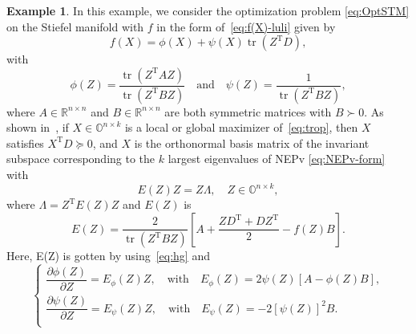 \documentclass[11pt]{article}
\def\bbO{\mathbb{O}}
\def\bbR{\mathbb{R}}
\DeclareMathOperator{\tr}{tr}
\DeclareMathOperator{\T}{T}
\theoremstyle{definition}
\newtheorem{example}{Example}[section]
\numberwithin{equation}{section}
\numberwithin{figure}{section}
\numberwithin{table}{section}
\begin{document}
\iffalse
\begin{example}\label{eg2}
In this example, we consider the optimization problem \eqref{eq:OptSTM} on the Stiefel manifold
with $f$ in the form of~\eqref{eq:f(X)-luli} given by
\begin{equation} \label{eq:trop}
f(X)=\phi(X)+\psi(X)\tr(Z^{\T}D),
\end{equation}
with
\[
\phi(Z)=\frac{\tr(Z^{\T}AZ)}{\tr(Z^{\T}BZ)}\quad\mbox{and}\quad\psi(Z)=\frac{1}{\tr(Z^{\T}BZ)},
\]
where $A\in\bbR^{n\times n}$ and $B\in\bbR^{n\times n}$ are both symmetric matrices with $B\succ 0$.
As shown in~\cite[Theorem~2.3]{wazl:2022}, if $X\in\bbO^{n\times k}$ is a local or global maximizer of~\eqref{eq:trop},
then $X$ satisfies $X^{\T}D\succeq 0$, and $X$ is the orthonormal basis matrix of the invariant subspace
corresponding to the $k$ largest eigenvalues of NEPv \eqref{eq:NEPv-form} with
\begin{equation} \label{eq:nepv2}
    E(Z)Z=Z\Lambda, \quad Z\in\bbO^{n\times k},
\end{equation}
where $\Lambda=Z^{\T}E(Z)Z$ and $E(Z)$ is
\[E(Z)=\frac{2}{\tr(Z^{\T}BZ)}\left[A+\frac{ZD^{\T}+DZ^{\T}}{2}-f(Z)B\right].\]
Here, E(Z) is gotten by using~\eqref{eq:hg} and
\[\begin{cases}
    \dfrac{\partial\phi(Z)}{\partial Z}=E_{\phi}(Z)Z,\quad\mbox{with}\quad E_{\phi}(Z)=2\psi(Z)[A-\phi(Z)B],\\[1em]
    \dfrac{\partial\psi(Z)}{\partial Z}=E_{\psi}(Z)Z,\quad\mbox{with}\quad E_{\psi}(Z)=-2[\psi(Z)]^2 B.\\
\end{cases}
\]


\end{example}
\end{document}
